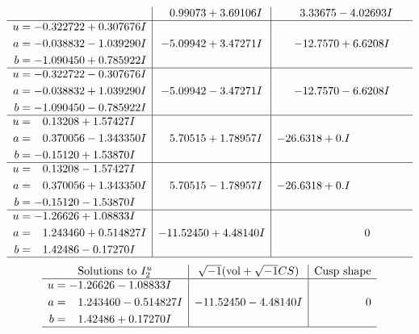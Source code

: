 \documentclass[1p]{elsarticle_modified}
\theoremstyle{definition}
\newcommand{\I}{\sqrt{-1}}
\begin{document}
$$\begin{array}{c|c|c}
 & \phantom{-}0.99073 + 3.69106 I & \phantom{-}3.33675 - 4.02693 I \\ \hline\begin{aligned}
u &= -0.322722 + 0.307676 I \\
a &= -0.038832 - 1.039290 I \\
b &= -1.090450 + 0.785922 I\end{aligned}
 & -5.09942 + 3.47271 I & -12.7570 + 6.6208 I \\ \hline\begin{aligned}
u &= -0.322722 - 0.307676 I \\
a &= -0.038832 + 1.039290 I \\
b &= -1.090450 - 0.785922 I\end{aligned}
 & -5.09942 - 3.47271 I & -12.7570 - 6.6208 I \\ \hline\begin{aligned}
u &= \phantom{-}0.13208 + 1.57427 I \\
a &= \phantom{-}0.370056 - 1.343350 I \\
b &= -0.15120 + 1.53870 I\end{aligned}
 & \phantom{-}5.70515 + 1.78957 I & -26.6318 + 0. I\phantom{ +0.000000I} \\ \hline\begin{aligned}
u &= \phantom{-}0.13208 - 1.57427 I \\
a &= \phantom{-}0.370056 + 1.343350 I \\
b &= -0.15120 - 1.53870 I\end{aligned}
 & \phantom{-}5.70515 - 1.78957 I & -26.6318 + 0. I\phantom{ +0.000000I} \\ \hline\begin{aligned}
u &= -1.26626 + 1.08833 I \\
a &= \phantom{-}1.243460 + 0.514827 I \\
b &= \phantom{-}1.42486 - 0.17270 I\end{aligned}
 & -11.52450 + 4.48140 I & \phantom{-0.000000 } 0\\
 \hline 
 \end{array}$$\newpage$$\begin{array}{c|c|c}  
\text{Solutions to }I^u_{2}& \I (\text{vol} + \sqrt{-1}CS) & \text{Cusp shape}\\
 \hline 
\begin{aligned}
u &= -1.26626 - 1.08833 I \\
a &= \phantom{-}1.243460 - 0.514827 I \\
b &= \phantom{-}1.42486 + 0.17270 I\end{aligned}
 & -11.52450 - 4.48140 I & \phantom{-0.000000 } 0\\
 \hline 
 \end{array}$$\newpage
\end{document}
